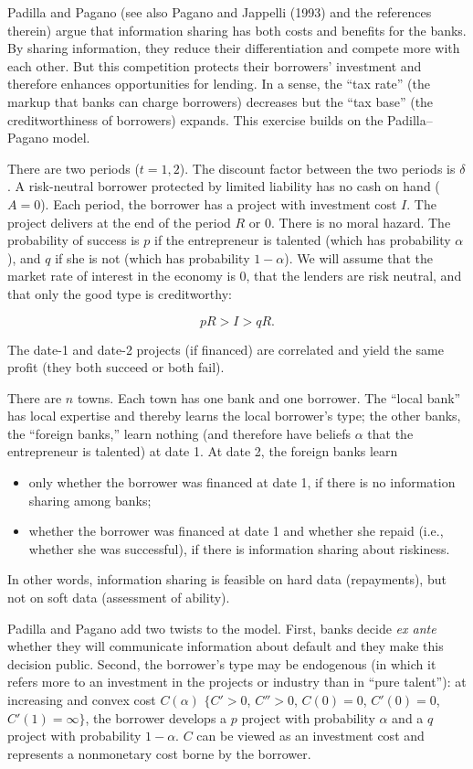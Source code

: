\documentclass[11pt,a4paper]{article}
\providecommand{\tightlist}{\setlength{\itemsep}{0pt}\setlength{\parskip}{0pt}}
\begin{document}
Padilla and Pagano (see also Pagano and Jappelli (1993) and the references therein) argue that
information sharing has both costs and benefits for the banks. By sharing information, they reduce
their differentiation and compete more with each other. But this competition protects their
borrowers' investment and therefore enhances opportunities for lending. In a sense, the ``tax rate''
(the markup that banks can charge borrowers) decreases but the ``tax base'' (the creditworthiness of
borrowers) expands. This exercise builds on the Padilla--Pagano model.

There are two periods (\(t = 1, 2\)). The discount factor between the two periods is \(\delta\). A
risk-neutral borrower protected by limited liability has no cash on hand (\(A = 0\)). Each period,
the borrower has a project with investment cost \(I\). The project delivers at the end of the period
\(R\) or 0. There is no moral hazard. The probability of success is \(p\) if the entrepreneur is
talented (which has probability \(\alpha\)), and \(q\) if she is not (which has probability
\(1 - \alpha\)). We will assume that the market rate of interest in the economy is 0, that the
lenders are risk neutral, and that only the good type is creditworthy:

\[pR > I > qR.\]

The date-1 and date-2 projects (if financed) are correlated and yield the same profit (they both
succeed or both fail).

There are \(n\) towns. Each town has one bank and one borrower. The ``local bank'' has local
expertise and thereby learns the local borrower's type; the other banks, the ``foreign banks,''
learn nothing (and therefore have beliefs \(\alpha\) that the entrepreneur is talented) at date 1.
At date 2, the foreign banks learn

\begin{itemize}
\tightlist
\item
  only whether the borrower was financed at date 1, if there is no information sharing among banks;
\item
  whether the borrower was financed at date 1 and whether she repaid (i.e., whether she was
  successful), if there is information sharing about riskiness.
\end{itemize}

In other words, information sharing is feasible on hard data (repayments), but not on soft data
(assessment of ability).

Padilla and Pagano add two twists to the model. First, banks decide \emph{ex ante} whether they will
communicate information about default and they make this decision public. Second, the borrower's
type may be endogenous (in which it refers more to an investment in the projects or industry than in
``pure talent''): at increasing and convex cost \(C(\alpha)\) \(\{C' > 0\), \(C'' > 0\),
\(C(0) = 0\), \(C'(0) = 0\), \(C'(1) = \infty\}\), the borrower develops a \(p\) project with
probability \(\alpha\) and a \(q\) project with probability \(1 - \alpha\). \(C\) can be viewed as
an investment cost and represents a nonmonetary cost borne by the borrower.
\end{document}

